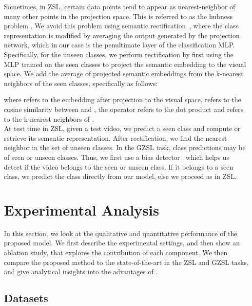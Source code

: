 \documentclass[runningheads]{llncs}
\begin{document}

Sometimes, in ZSL, certain data points tend to appear as nearest-neighbor of many other points in the projection space. This is referred to as the hubness problem \cite{shigeto2015ridge}. We avoid this problem using semantic rectification~\cite{luo2017zero}, where the class representation is modified by averaging the output generated by the projection network, which in our case is the penultimate layer of the classification MLP. Specifically, for the unseen classes, we perform rectification by first using the MLP trained on the seen classes to project the semantic embedding to the visual space. We add the average of projected semantic embeddings from the k-nearest neighbors of the seen classes, specifically as follows:





where  refers to the embedding after projection to the visual space,  refers to the cosine similarity between  and , the operator  refers to the dot product and  refers to the k-nearest neighbors of .
\\

At test time in ZSL, given a test video, we predict a seen class and compute or retrieve its semantic representation. After rectification, we find the nearest neighbor in the set of unseen classes. 
In the GZSL task, class predictions may be of seen or unseen classes. Thus, we first use a bias detector~\cite{gao2019know} which helps us detect if the video belongs to the seen or unseen class. If it belongs to a seen class, we predict the class directly from our model, else we proceed as in ZSL. \\

\section{Experimental Analysis}
\label{sec:analysis}

In this section, we look at the qualitative and quantitative performance of the proposed model. We first describe the experimental settings, and then show an ablation study, that explores the contribution of each component. We then compare the proposed method to the state-of-the-art in the ZSL and GZSL tasks, and give analytical insights into the advantages of \MethodName. 



\subsection{Datasets}
\end{document}
